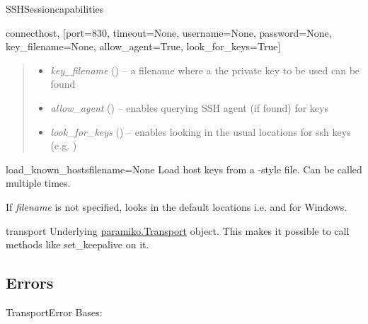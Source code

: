 \documentclass[a4paper,10pt,english]{manual}
\begin{document}
\begin{classdesc}{SSHSession}{capabilities}
\begin{methoddesc}{connect}{host, {[}port=830, timeout=None, username=None, password=None, key\_filename=None, allow\_agent=True, look\_for\_keys=True{]}}
\begin{quote}
\begin{description}
\begin{itemize}
\item {} 
\emph{key\_filename} (\href{http://docs.python.org/library/string.html\#string}{}) -- a filename where a the private key to be used can be found

\item {} 
\emph{allow\_agent} (\href{http://docs.python.org/library/functions.html\#bool}{}) -- enables querying SSH agent (if found) for keys

\item {} 
\emph{look\_for\_keys} (\href{http://docs.python.org/library/functions.html\#bool}{}) -- enables looking in the usual locations for ssh keys (e.g. )

\end{itemize}

\end{description}\end{quote}
\end{methoddesc}

\hypertarget{ncclient.transport.SSHSession.load_known_hosts}{}\begin{methoddesc}{load\_known\_hosts}{filename=None}
Load host keys from a -style file. Can be called multiple
times.

If \emph{filename} is not specified, looks in the default locations i.e.
 and  for Windows.
\end{methoddesc}

\hypertarget{ncclient.transport.SSHSession.transport}{}\begin{memberdesc}{transport}
Underlying \href{http://www.lag.net/paramiko/docs/paramiko.Transport-class.html}{paramiko.Transport}
object. This makes it possible to call methods like set\_keepalive on it.
\end{memberdesc}
\end{classdesc}


\subsection{Errors}

\hypertarget{ncclient.transport.TransportError}{}\begin{excdesc}{TransportError}
Bases: 
\end{excdesc}
\end{document}
